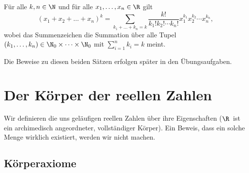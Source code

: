 \documentclass[a4paper]{article}
\begin{document}
\begin{theorem}[Multinomialsatz]
    Für alle $k, n \in \N$ und für alle $x_1, \dots, x_n \in \R$ gilt
    \begin{equation*}
        (x_1 + x_2 + \dots + x_n)^k = \sum_{k_1 + \dots + k_n = k} \frac{k!}{k_1! k_2! \cdots k_n!} x_1^{k_1} x_2^{k_2} \cdots x_n^{k_n},
    \end{equation*}
    wobei das Summenzeichen die Summation über alle Tupel $(k_1, \dots, k_n) \in \N_0 \times \dots \times \N_0$ mit $\sum_{i = 1}^n k_i = k$ meint.
\end{theorem}

Die Beweise zu diesen beiden Sätzen erfolgen später in den Übungsaufgaben.

\section{Der Körper der reellen Zahlen}

Wir definieren die uns geläufigen reellen Zahlen über ihre Eigenschaften ($\R$~ist ein archimedisch angeordneter, vollständiger Körper). Ein Beweis, dass ein solche Menge wirklich existiert, werden wir nicht machen.

\subsection{Körperaxiome}
\end{document}
